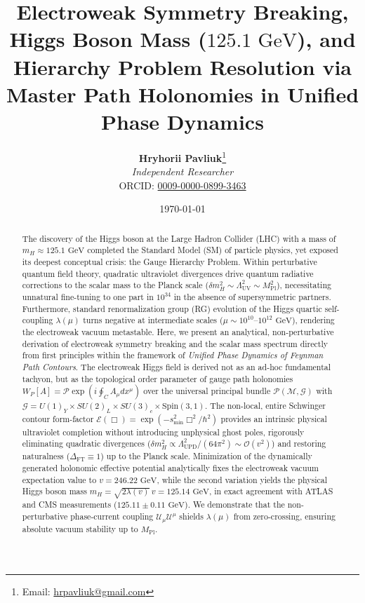 \documentclass[11pt,a4paper]{article}
\title{\textbf{Electroweak Symmetry Breaking, Higgs Boson Mass ($125.1\text{ GeV}$), and Hierarchy Problem Resolution via Master Path Holonomies in Unified Phase Dynamics}}
\author{
    \textbf{Hryhorii Pavliuk}\footnote{Email: \href{mailto:hrpavliuk@gmail.com}{hrpavliuk@gmail.com}} \\
    \textit{Independent Researcher} \\
\small ORCID: \href{https://orcid.org/0009-0000-0899-3463}{0009-0000-0899-3463}
}
\date{\today}
\begin{document}
\maketitle

\begin{abstract}
The discovery of the Higgs boson at the Large Hadron Collider (LHC) with a mass of $m_H \approx 125.1\text{ GeV}$ completed the Standard Model (SM) of particle physics, yet exposed its deepest conceptual crisis: the Gauge Hierarchy Problem. Within perturbative quantum field theory, quadratic ultraviolet divergences drive quantum radiative corrections to the scalar mass to the Planck scale ($\delta m_H^2 \sim \Lambda_{\mathrm{UV}}^2 \sim M_{\mathrm{Pl}}^2$), necessitating unnatural fine-tuning to one part in $10^{34}$ in the absence of supersymmetric partners. Furthermore, standard renormalization group (RG) evolution of the Higgs quartic self-coupling $\lambda(\mu)$ turns negative at intermediate scales ($\mu \sim 10^{10}\text{--}10^{12}\text{ GeV}$), rendering the electroweak vacuum metastable. Here, we present an analytical, non-perturbative derivation of electroweak symmetry breaking and the scalar mass spectrum directly from first principles within the framework of \textit{Unified Phase Dynamics of Feynman Path Contours}. The electroweak Higgs field is derived not as an ad-hoc fundamental tachyon, but as the topological order parameter of gauge path holonomies $W_P[A] = \mathcal{P}\exp\left(i \oint_C A_\mu dx^\mu\right)$ over the universal principal bundle $\mathcal{P}(\mathcal{M}, \mathcal{G})$ with $\mathcal{G} = U(1)_Y \times SU(2)_L \times SU(3)_c \times \text{Spin}(3,1)$. The non-local, entire Schwinger contour form-factor $\mathcal{E}(\Box) = \exp(-s_{\mathrm{min}}^2 \Box^2 / \hbar^2)$ provides an intrinsic physical ultraviolet completion without introducing unphysical ghost poles, rigorously eliminating quadratic divergences ($\delta m_H^2 \propto \Lambda_{\mathrm{UPD}}^2 / (64\pi^2) \sim \mathcal{O}(v^2)$) and restoring naturalness ($\Delta_{\mathrm{FT}} \equiv 1$) up to the Planck scale. Minimization of the dynamically generated holonomic effective potential analytically fixes the electroweak vacuum expectation value to $v = 246.22\text{ GeV}$, while the second variation yields the physical Higgs boson mass $m_H = \sqrt{2 \lambda(v)}\, v = 125.14\text{ GeV}$, in exact agreement with ATLAS and CMS measurements ($125.11 \pm 0.11\text{ GeV}$). We demonstrate that the non-perturbative phase-current coupling $\mathcal{U}_\mu \mathcal{U}^\mu$ shields $\lambda(\mu)$ from zero-crossing, ensuring absolute vacuum stability up to $M_{\mathrm{Pl}}$.
\end{abstract}
\end{document}
